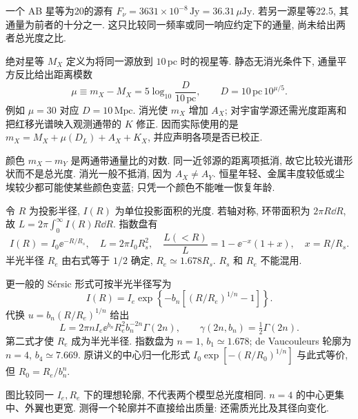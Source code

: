 \begin{example}
一个 AB 星等为20的源有 $F_\nu=3631\times10^{-8}\,\mathrm{Jy}=36.31\,\mu\mathrm{Jy}$. 若另一源星等22.5, 其通量为前者的十分之一. 这只比较同一频率或同一响应约定下的通量, 尚未给出两者总光度之比.
\end{example}

绝对星等 $M_X$ 定义为将同一源放到 $10\,\mathrm{pc}$ 时的视星等. 静态无消光条件下, 通量平方反比给出距离模数
\[
\mu\equiv m_X-M_X=5\log_{10}\frac{D}{10\,\mathrm{pc}},
\qquad D=10\,\mathrm{pc}\,10^{\mu/5}.
\]
例如 $\mu=30$ 对应 $D=10\,\mathrm{Mpc}$. 消光使 $m_X$ 增加 $A_X$; 对宇宙学源还需光度距离和把红移光谱映入观测通带的 $K$ 修正. 因而实际使用的是 $m_X=M_X+\mu(D_L)+A_X+K_X$, 并应声明各项是否已校正.

颜色 $m_X-m_Y$ 是两通带通量比的对数. 同一近邻源的距离项抵消, 故它比较光谱形状而不是总光度. 消光一般不抵消, 因为 $A_X\ne A_Y$. 恒星年轻、金属丰度较低或尘埃较少都可能使某些颜色变蓝; 只凭一个颜色不能唯一恢复年龄.

令 $R$ 为投影半径, $I(R)$ 为单位投影面积的光度. 若轴对称, 环带面积为 $2\pi R\dd R$, 故 $L=2\pi\int_0^\infty I(R)R\dd R$. 指数盘有
\[
I(R)=I_0\ee^{-R/R_s},\quad L=2\pi I_0R_s^2,
\quad \frac{L(<R)}L=1-\ee^{-x}(1+x),\quad x=R/R_s.
\]
半光半径 $R_e$ 由右式等于 $1/2$ 确定, $R_e\simeq1.678R_s$. $R_s$ 和 $R_e$ 不能混用.

更一般的 Sérsic 形式可按半光半径写为
\[
I(R)=I_e\exp\left\{-b_n\left[(R/R_e)^{1/n}-1\right]\right\}.
\]
代换 $u=b_n(R/R_e)^{1/n}$ 给出
\[
L=2\pi nI_e\ee^{b_n}R_e^2b_n^{-2n}\Gamma(2n),\qquad
\gamma(2n,b_n)=\tfrac12\Gamma(2n).
\]
第二式才使 $R_e$ 成为半光半径. 指数盘为 $n=1$, $b_1\simeq1.678$; de Vaucouleurs 轮廓为 $n=4$, $b_4\simeq7.669$. 原讲义的中心归一化形式 $I_0\exp[-(R/R_0)^{1/n}]$ 与此式等价, 但 $R_0=R_e/b_n^n$.

\begin{center}
\end{center}
图比较同一 $I_e,R_e$ 下的理想轮廓, 不代表两个模型总光度相同. $n=4$ 的中心更集中、外翼也更宽. 测得一个轮廓并不直接给出质量: 还需质光比及其径向变化.

